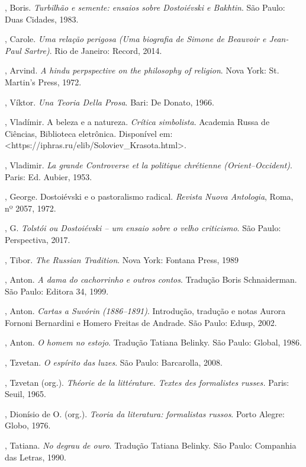 \begin{Parskip}
{, Boris. \emph{Turbilhão e semente: ensaios sobre Dostoiévski e Bakhtin}. São Paulo: Duas Cidades, 1983.

, Carole. \emph{Uma relação perigosa (Uma biografia
de Simone de Beauvoir e Jean-Paul Sartre)}. Rio de Janeiro: Record, 2014.

, Arvind. \emph{A hindu perpspective on the philosophy of
religion}. Nova York: St. Martin's Press, 1972.

, Víktor. \emph{Una Teoria Della Prosa}. Bari: De Donato, 1966.

, Vladímir. A beleza e a natureza. \emph{Crítica simbolista}. Academia Russa de Ciências,
  Biblioteca eletrônica. Disponível em: \textless{}https://iphras.ru/elib/Soloviev\_Krasota.html\textgreater{}.

, Vladimir. \emph{La grande Controverse et la politique
chrétienne (Orient--Occident)}. Paris: Ed. Aubier, 1953.

, George. Dostoiévski e o pastoralismo radical. \emph{Revista Nuova Antologia}, Roma, nº 2057, 1972.

, G. \emph{Tolstói ou Dostoiévski -- um ensaio sobre o velho criticismo}. São Paulo: Perspectiva, 2017.

, Tibor. \emph{The Russian Tradition}. Nova York: Fontana Press, 1989

, Anton. \emph{A dama do cachorrinho e outros contos}. Tradução Boris Schnaiderman. São Paulo: Editora 34, 1999.

, Anton. \emph{Cartas a Suvórin (1886--1891)}. Introdução, tradução
e notas Aurora Fornoni Bernardini e Homero Freitas de Andrade. São Paulo: Edusp, 2002.

, Anton. \emph{O homem no estojo}. Tradução Tatiana Belinky. São Paulo: Global, 1986.

, Tzvetan. \emph{O espírito das luzes}. São Paulo: Barcarolla, 2008.

, Tzvetan (org.). \emph{Théorie de la littérature. Textes des 
formalistes russes.} Paris: Seuil, 1965.

, Dionísio de O. (org.). \emph{Teoria da literatura: formalistas russos}. Porto Alegre: Globo, 1976.

, Tatiana. \emph{No degrau de ouro}. Tradução Tatiana Belinky. São Paulo: Companhia das Letras, 1990.

}
\end{Parskip}
